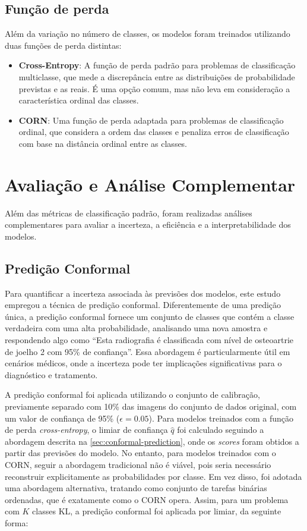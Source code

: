 \subsection{Função de perda}

Além da variação no número de classes, os modelos foram treinados utilizando duas funções de perda distintas:

\begin{itemize}
    \item \textbf{Cross-Entropy}: A função de perda padrão para problemas de classificação multiclasse, que mede a discrepância entre as distribuições de probabilidade previstas e as reais. É uma opção comum, mas não leva em consideração a característica ordinal das classes.
    \item \textbf{CORN}: Uma função de perda adaptada para problemas de classificação ordinal, que considera a ordem das classes e penaliza erros de classificação com base na distância ordinal entre as classes.
\end{itemize}

\section{Avaliação e Análise Complementar}

Além das métricas de classificação padrão, foram realizadas análises complementares para avaliar a incerteza, a eficiência e a interpretabilidade dos modelos.

\subsection{Predição Conformal}

Para quantificar a incerteza associada às previsões dos modelos, este estudo empregou a técnica de predição conformal. Diferentemente de uma predição única, a predição conformal fornece um conjunto de classes que contém a classe verdadeira com uma alta probabilidade, analisando uma nova amostra e respondendo algo como ``Esta radiografia é classificada com nível de osteoartrie de joelho 2 com 95\% de confiança''. Essa abordagem é particularmente útil em cenários médicos, onde a incerteza pode ter implicações significativas para o diagnóstico e tratamento.

A predição conformal foi aplicada utilizando o conjunto de calibração, previamente separado com 10\% das imagens do conjunto de dados original, com um valor de confiança de 95\% ($\epsilon = 0.05$). Para modelos treinados com a função de perda \textit{cross-entropy}, o limiar de confiança $\hat{q}$ foi calculado seguindo a abordagem descrita na \autoref{sec:conformal-prediction}, onde os \textit{scores} foram obtidos a partir das previsões do modelo. No entanto, para modelos treinados com o CORN, seguir a abordagem tradicional não é viável, pois seria necessário reconstruir explicitamente as probabilidades por classe. Em vez disso, foi adotada uma abordagem alternativa, tratando como conjunto de tarefas binárias ordenadas, que é exatamente como o CORN opera. Assim, para um problema com $K$ classes KL, a predição conformal foi aplicada por limiar, da seguinte forma:

